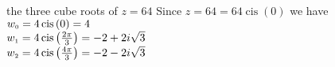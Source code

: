 { the three cube roots of $z=64$}
{ Since $z = 64 = 64\operatorname{cis}\left(0\right)$ we have \\$w_{\text{\tiny$0$}} = 4\operatorname{cis}\left(0\right) = 4$\\$w_{\text{\tiny$1$}} =4\operatorname{cis}\left(\frac{2\pi}{3}\right) = -2 + 2i\sqrt{3}$\\$w_{\text{\tiny$2$}} = 4\operatorname{cis}\left(\frac{4\pi}{3}\right) =  -2 - 2i\sqrt{3}$}
